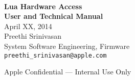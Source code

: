 
\begin{titlepage}

\setlength{\parindent}{0in}

{
	\fontsize{32}{32}\selectfont
	\textcolor{AppleGray}{\AppleLogo}
}
\\[0.25in]

{
	\fontsize{32}{32}\selectfont
	\textcolor{SmokeyDarkBlue}{\bfseries Lua Hardware Access} \\
	\textbf{User and Technical Manual}
}
\\[0.25in]

April XX, 2014
\\[0.25in]

Preethi Srinivasan \\
System Software Engineering, Firmware \\
\texttt{preethi\_srinivasan@apple.com}

\vfill

\begin{center}
Apple Confidential --- Internal Use Only
\end{center}

\end{titlepage}
